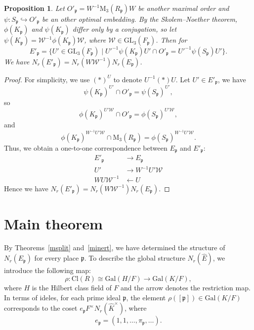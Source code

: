 \documentclass[12pt]{article}
\theoremstyle{plain}
\newtheorem{proposition}[theorem]{Proposition}
\theoremstyle{definition}
\theoremstyle{remark}
\begin{document}
\begin{proposition}\label{EE}
Let $O'_\mathfrak{p}=W^{-1}\mathrm{M}_3(R_\mathfrak{p})W$ be another maximal order and $\psi:S_\mathfrak{p}\hookrightarrow O'_\mathfrak{p}$ be an other optimal embedding. By the Skolem–Noether theorem, $\phi(K_\mathfrak{p})$ and $\psi(K_\mathfrak{p})$ differ only by a conjugation, so let $\psi(K_\mathfrak{p})= \mathcal{W}^{-1}\phi(K_\mathfrak{p})\mathcal{W}$, where $\mathcal{W}\in \mathrm{GL}_3(F_\mathfrak{p})$. Then for 
$$E'_\mathfrak{p}=\{U'\in \mathrm{GL}_3(F_\mathfrak{p})\mid U'^{-1}\psi(K_\mathfrak{p})U'\cap O'_\mathfrak{p}= U'^{-1}\psi(S_\mathfrak{p})U'\}.$$
We have $N_r(E'_\mathfrak{p})=N_r(W\mathcal{W}^{-1})N_r(E_\mathfrak{p})$.
\end{proposition}
\begin{proof}
For simplicity, we use $(*)^U$ to denote $U^{-1} (*) U$. Let $U'\in E'_\mathfrak{p}$, we have
$$\psi(K_\mathfrak{p})^{U'}\cap O'_\mathfrak{p}=\psi(S_\mathfrak{p})^{U'},$$
so
$$\phi(K_\mathfrak{p})^{U'\mathcal{W}}\cap O'_\mathfrak{p}=\phi(S_\mathfrak{p})^{U'\mathcal{W}},$$
and
$$\phi(K_\mathfrak{p})^{W^{-1}U'\mathcal{W}}\cap \mathrm{M}_3(R_\mathfrak{p})=\phi(S_\mathfrak{p})^{W^{-1}U'\mathcal{W}}.$$
Thus, we obtain a one-to-one correspondence between $E_\mathfrak{p}$ and $E'_\mathfrak{p}$:
\begin{align*}
E'_\mathfrak{p}&\longrightarrow E_\mathfrak{p}\\
U'&\longrightarrow W^{-1}U'\mathcal{W}\\
WU\mathcal{W}^{-1}&\longleftarrow U
\end{align*}
Hence we have $N_r(E'_\mathfrak{p})=N_r(W\mathcal{W}^{-1})N_r(E_\mathfrak{p})$.
\end{proof}




\section{Main theorem}
By Theorems~\ref{msplit} and~\ref{minert}, we have determined the structure of $N_r(E_\mathfrak{p})$ for every place $\mathfrak{p}$. To describe the global structure $N_r(\widehat{E})$, we introduce the following map:
$$\rho: \mathrm{Cl}(R)\cong \mathrm{Gal}(H/F)\longrightarrow \mathrm{Gal}(K/F),$$
where $H$ is the Hilbert class field of $F$ and the arrow denotes the restriction map. In terms of ideles, for each prime ideal $\mathfrak{p}$, the element $\rho([\mathfrak{p}])\in\mathrm{Gal}(K/F)$ corresponds to the coset $e_{\mathfrak{p}}F^\times N_r(\widehat{K}^\times)$, where
$$e_{\mathfrak{p}}=(1,1,\dots,\pi_{\mathfrak{p}},\dots).$$
\end{document}
